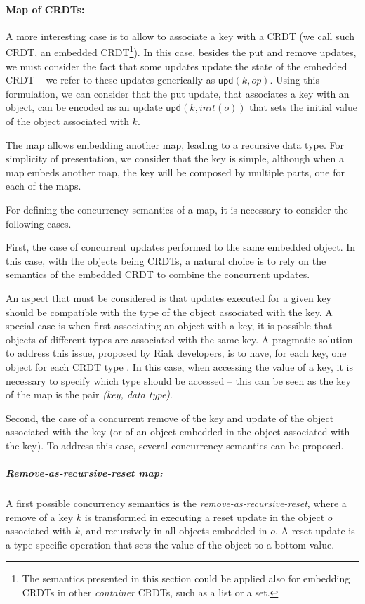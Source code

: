 \documentclass[12pt]{article}
\begin{document}
\paragraph{Map of CRDTs:}
A more interesting case is to allow to associate a key with a CRDT
(we call such CRDT, an embedded CRDT\footnote{The semantics presented in 
this section could be applied also for embedding CRDTs in other \emph{container} 
CRDTs, such as a list or a set.}).
In this case, besides the put and remove updates, we must consider the fact
that some updates update the state of the embedded CRDT -- we refer
to these updates generically as $\mathsf{upd}(k,op)$. 
Using this formulation, we can consider that the put update, that associates a key
with an object, can be encoded as an update $\mathsf{upd}(k,init(o))$
that sets the initial value of the object associated with $k$.

The map allows embedding another map, leading to a recursive data type.
For simplicity of presentation, we consider 
that the key is simple, although when a map embeds another map, the 
key will be composed by multiple parts, one for each of the maps.

For defining the concurrency semantics of a map, it is necessary to consider 
the following cases.

First, the case of concurrent updates performed to the same embedded
object. In this case, with the objects being CRDTs, a natural choice is 
to rely on the semantics of the embedded CRDT to combine the 
concurrent updates.

An aspect that must be considered is that updates executed for a given key
should be compatible with the type of the object associated with the key.
A special case is when first associating an object with a key, it is possible
that objects of different types are associated with the same key.
A pragmatic solution to address this issue, proposed by Riak developers,
is to have, for each key, one object for each CRDT type \cite{Brown14Riak}.
In this case, when accessing the value of a key, it is necessary to specify 
which type should be accessed -- this can be seen as the key of the 
map is the pair \emph{(key, data type)}.

Second, the case of a concurrent remove of the key and update of the object 
associated with the key (or of an object embedded in the object associated
with the key).
To address this case, several concurrency semantics can be proposed.

\subparagraph{Remove-as-recursive-reset map:}
A first possible concurrency semantics is the \emph{remove-as-recursive-reset}, where 
a remove of a key $k$ is transformed in executing a reset update 
in the object $o$ associated with $k$, and recursively in all objects 
embedded in $o$. 
A reset update is a type-specific operation that sets the value of the
object to a bottom value.
\end{document}
